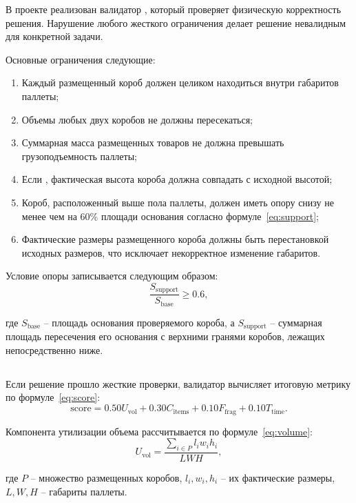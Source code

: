 В проекте реализован валидатор , который проверяет физическую корректность решения. Нарушение любого жесткого ограничения делает решение невалидным для конкретной задачи.

Основные ограничения следующие:
\begin{enumerate}
  \item Каждый размещенный короб должен целиком находиться внутри габаритов паллеты;
  \item Объемы любых двух коробов не должны пересекаться;
  \item Суммарная масса размещенных товаров не должна превышать грузоподъемность паллеты;
  \item Если , фактическая высота короба должна совпадать с исходной высотой;
  \item Короб, расположенный выше пола паллеты, должен иметь опору снизу не менее чем на 60\% площади основания согласно формуле~\eqref{eq:support};
  \item Фактические размеры размещенного короба должны быть перестановкой исходных размеров, что исключает некорректное изменение габаритов.
\end{enumerate}

Условие опоры записывается следующим образом:
\begin{equation}
\frac{S_{\mathrm{support}}}{S_{\mathrm{base}}} \geq 0.6,
\label{eq:support}
\end{equation}
\par\indent
где $S_{\mathrm{base}}$ -- площадь основания проверяемого короба, а $S_{\mathrm{support}}$ -- суммарная площадь пересечения его основания с верхними гранями коробов, лежащих непосредственно ниже.

\subsection{}

Если решение прошло жесткие проверки, валидатор вычисляет итоговую метрику по формуле~\eqref{eq:score}:
\begin{equation}
\mathrm{score}=0.50U_{\mathrm{vol}}+0.30C_{\mathrm{items}}+0.10F_{\mathrm{frag}}+0.10T_{\mathrm{time}}.
\label{eq:score}
\end{equation}

Компонента утилизации объема рассчитывается по формуле~\eqref{eq:volume}:
\begin{equation}
U_{\mathrm{vol}}=\frac{\sum_{i \in P} l_i w_i h_i}{LWH},
\label{eq:volume}
\end{equation}
\par\indent
где $P$ -- множество размещенных коробов, $l_i,w_i,h_i$ -- их фактические размеры, $L,W,H$ -- габариты паллеты.

